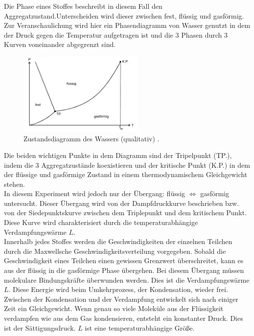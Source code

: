 Die \glqq Phase\grqq{} eines Stoffes beschreibt in diesem Fall den Aggregatzustand.Unterscheiden wird dieser zwischen fest, 
flüssig und gasförmig.
Zur Veranschaulichung wird hier ein Phasendiagramm von Wasser genutzt in dem der Druck gegen die Temperatur aufgetragen ist und die 3 
\glqq Phasen\grqq{} durch 3 Kurven voneinander abgegrenzt sind.\\
\begin{figure}[H]
    \centering
    \includegraphics[width=0.55\textwidth]{images/Diagramm.PNG}
    \caption{Zustandsdiagramm des Wassers (qualitativ) \protect \cite{V203}.}
    \label{img:Zustand}
\end{figure}
\noindent Die beiden wichtigen Punkte in dem Diagramm sind der Tripelpunkt (TP.), indem die 
3 Aggregatzustände koexistieren und der kritische Punkt (K.P.) in dem der flüssige und gasförmige Zustand in einem 
thermodynamischem Gleichgewicht stehen.\\
In diesem Experiment wird jedoch nur der Übergang: flüssig $\Leftrightarrow$ gasförmig untersucht. 
Dieser Übergang wird von der Dampfdruckkurve beschrieben bzw. von der Siedepunktskurve zwischen dem Triplepunkt und dem kritischem Punkt.
Diese Kurve wird charakterisiert durch die temperaturabhängige Verdampfungswärme $L$. \\
Innerhalb jedes Stoffes werden die Geschwindigkeiten der einzelnen Teilchen
durch die Maxwellsche Geschwindigkeitsverteilung vorgegeben. Sobald die Geschwindigkeit eines Teilchen einen gewissen Grenzwert 
überschreitet, kann es aus der flüssig in die gasförmige Phase übergehen. Bei diesem Übergang müssen molekulare Bindungskräfte überwunden
werden. Dies ist die Verdampfungswärme $L$. Diese Energie wird beim Umkehrprozess, der Kondensation, wieder frei.\\
Zwischen der Kondensation und der Verdampfung entwickelt sich nach einiger Zeit ein Gleichgewicht.
Wenn genau so viele Moleküle aus der Flüssigkeit verdampfen wie aus dem Gas kondensieren, entsteht ein konstanter Druck.
Dies ist der Sättigungsdruck. $L$ ist eine temperaturabhängige Größe.

